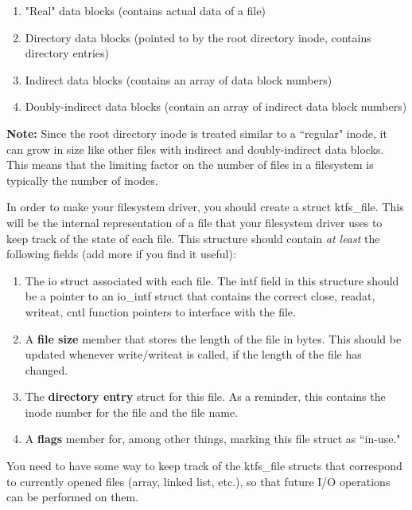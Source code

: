 \documentclass{article}
\begin{document}
\begin{enumerate}
	\item{"Real" data blocks (contains actual data of a file)}
	\item{Directory data blocks (pointed to by the root directory inode, contains directory entries)}
	\item{Indirect data blocks (contains an array of data block numbers)}
	\item{Doubly-indirect data blocks (contain an array of indirect data block numbers)}
\end{enumerate}

\textbf{Note:} Since the root directory inode is treated similar to a ``regular" inode, it can grow in size like other files with indirect and doubly-indirect data blocks. 
This means that the limiting factor on the number of files in a filesystem is typically the number of inodes.


In order to make your filesystem driver, you should create a {\fix struct ktfs\_file}.
This will be the internal representation of a file that your filesystem driver uses
to keep track of the state of each file.
This structure should contain \emph{at least} the following fields (add more if you find it useful):

\begin{enumerate}

	\item{The {\fix io} struct associated with each file. The {\fix intf}
		field in this structure should be a pointer to an {\fix io\_intf} struct that
		contains the correct {\fix close, readat, writeat, cntl} function pointers to
		interface with the file.}


	\item{A \textbf{file size} member that stores the length of the file in bytes. This should
		be updated whenever write/writeat is called, if the length of the file has changed.}

	\item{The \textbf{directory entry} struct for this file. As a reminder, this contains the
		inode number for the file and the file name.}

	\item{A \textbf{flags} member for, among other things, marking this file
	      struct as ``in-use."}

\end{enumerate}

You need to have some way to keep track of the {\fix ktfs\_file} structs that correspond to currently 
opened files (array, linked list, etc.), so that future I/O operations can be performed on them.
\end{document}
